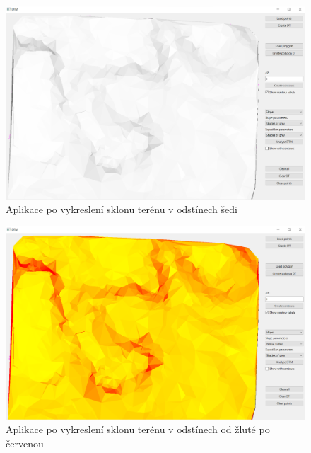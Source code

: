 \documentclass[11pt]{article}
\begin{document}
\begin{figure}[htbh]
	\centering
	\captionsetup{justification=centering}
	\includegraphics[scale=0.35]{images/vystup_AnalyzeDTM_slope_shadesofgray.png} 
	\caption{Aplikace po vykreslení sklonu terénu v odstínech šedi}	\label{fig:vystup_AnalyzeDTM_slope_shadesofgray}
\end{figure} 
\begin{figure}[htbh]
	\centering
	\captionsetup{justification=centering}
	\includegraphics[scale=0.35]{images/vystup_AnalyzeDTM_slope_y2r.png} 
	\caption{Aplikace po vykreslení sklonu terénu v odstínech od žluté po červenou}	\label{fig:vystup_AnalyzeDTM_slope_y2r}
\end{figure} 
\end{document}
